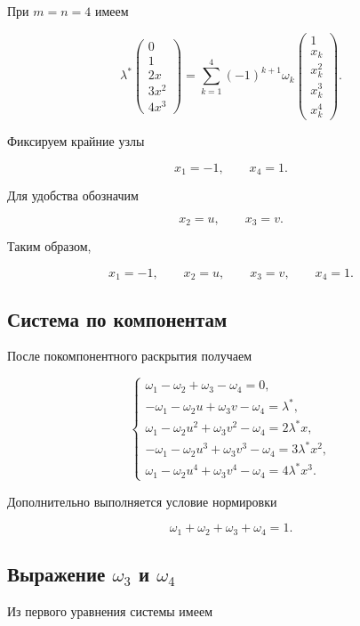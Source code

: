 \documentclass[12pt,a4paper]{article}
\begin{document}
	При $m=n=4$ имеем
	
	$$
	\lambda^*
	\begin{pmatrix}
		0\\
		1\\
		2x\\
		3x^2\\
		4x^3
	\end{pmatrix}
	=
	\sum_{k=1}^4
	(-1)^{k+1}\omega_k
	\begin{pmatrix}
		1\\
		x_k\\
		x_k^2\\
		x_k^3\\
		x_k^4
	\end{pmatrix}.
	$$
	
	Фиксируем крайние узлы
	
	$$
	x_1=-1,
	\qquad
	x_4=1.
	$$
	
	Для удобства обозначим
	
	$$
	x_2=u,
	\qquad
	x_3=v.
	$$
	
	Таким образом,
	
	$$
	x_1=-1,\qquad
	x_2=u,\qquad
	x_3=v,\qquad
	x_4=1.
	$$
	
	\subsection{Система по компонентам}
	
	После покомпонентного раскрытия получаем
	
	$$
	\begin{cases}
		\omega_1-\omega_2+\omega_3-\omega_4=0,\\[2mm]
		-\omega_1-\omega_2u+\omega_3v-\omega_4=\lambda^*,\\[2mm]
		\omega_1-\omega_2u^2+\omega_3v^2-\omega_4=2\lambda^*x,\\[2mm]
		-\omega_1-\omega_2u^3+\omega_3v^3-\omega_4=3\lambda^*x^2,\\[2mm]
		\omega_1-\omega_2u^4+\omega_3v^4-\omega_4=4\lambda^*x^3.
	\end{cases}
	$$
	
	Дополнительно выполняется условие нормировки
	
	$$
	\omega_1+\omega_2+\omega_3+\omega_4=1.
	$$
	
	\subsection{Выражение $\omega_3$ и $\omega_4$}
	
	Из первого уравнения системы имеем
	
\end{document}

